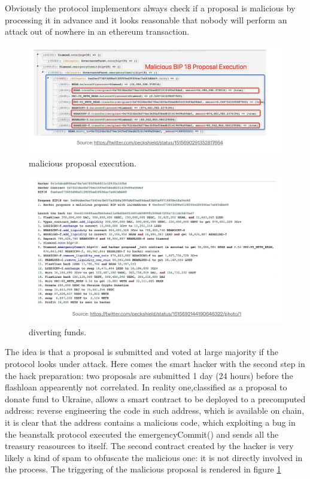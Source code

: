 \documentclass[11pt,a4paper,titlepage]{scrartcl}
\begin{document}
 Obviously the protocol implementors always check if a proposal is malicious by processing it in advance and it looks reasonable that nobody will perform an attack out of nowhere in an ethereum transaction.
 
 
 \begin{figure}[ht]
    \centering %
    \includegraphics[width=\textwidth, keepaspectratio]{image/beanstalk/maliciousProposalExecution.png}
    \caption{malicious proposal execution.}
    \label{fig:proposalexec}
\end{figure}
 
 \begin{figure}[ht]
    \centering %
    \includegraphics[width=\textwidth, keepaspectratio]{image/beanstalk/divertingfunds}
    \caption{diverting funds.}
    \label{fig:divfunds}
\end{figure}

 
 
 The idea is that a proposal is  submitted and voted at large majority if the protocol looks under attack. Here comes the smart hacker with the second step in the hack preparation: two proposals are submitted 1 day (24 hours) before the flashloan appearently not correlated. In reality one,classified as a proposal to donate fund to Ukraine, allows a smart contract to be deployed to a precomputed address: reverse engineering the code in such address, which is available on chain, it is clear that the address contains a malicious code, which exploiting a bug in the beanstalk protocol executed the emergencyCommit() and  sends all the treasury reasources to itself. The second contract created by the hacker is very likely a kind of spam to obfuscate the malicious one: it is not directly involved in the process.
 The triggering of the malicious proposal is rendered in figure \ref{fig:proposalexec}
\end{document}
